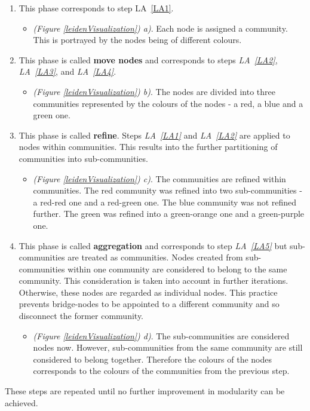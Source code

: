 \begin{enumerate}[label=\alph*)]
  \item This phase corresponds to step LA~\ref{LA1}. 
  \begin{itemize}
    \item \textit{(Figure \ref{leidenVisualization}) a)}. Each node is assigned a community. This is portrayed by the nodes being of different colours. \label{leidenAlgorithmPrincipleA}
  \end{itemize} 
    \label{LeAa}
  \item This phase is called \textbf{move nodes} and corresponds to steps \textit{LA~\ref{LA2}}, \textit{LA~\ref{LA3}}, and \textit{LA~\ref{LA4}}. 
  \begin{itemize}
    \item \textit{(Figure \ref{leidenVisualization}) b)}. The nodes are divided into three communities represented by the colours of the nodes - a red, a blue and a green one. \label{leidenAlgorithmPrincipleB}
  \end{itemize} 
    \label{LeAb}
  \item This phase is called \textbf{refine}. Steps \textit{LA~\ref{LA1}} and \textit{LA~\ref{LA2}} are applied to nodes within communities. This results into the further partitioning of communities into sub-communities.
  \begin{itemize}
    \item \textit{(Figure \ref{leidenVisualization}) c)}. The communities are refined within communities. The red community was refined into two sub-communities - a red-red one and a red-green one. The blue community was not refined further. The green was refined into a green-orange one and a green-purple one. 
  \end{itemize} 
    \label{LeAc}
  \item This phase is called \textbf{aggregation} and corresponds to step \textit{LA~\ref{LA5}}  but sub-communities are treated as communities. Nodes created from sub-communities within one community are considered to belong to the same community. This consideration is taken into account in further iterations. Otherwise, these nodes are regarded as individual nodes. This practice prevents bridge-nodes to be appointed to a different community and so disconnect the former community.
  \begin{itemize}
    \item \textit{(Figure \ref{leidenVisualization}) d)}. The sub-communities are considered nodes now. However, sub-communities from the same community are still considered to belong together. Therefore the colours of the nodes corresponds to the colours of the communities from the previous step. 
  \end{itemize} 
    \label{LeAd}
\end{enumerate}
These steps are repeated until no further improvement in modularity can be achieved. 

